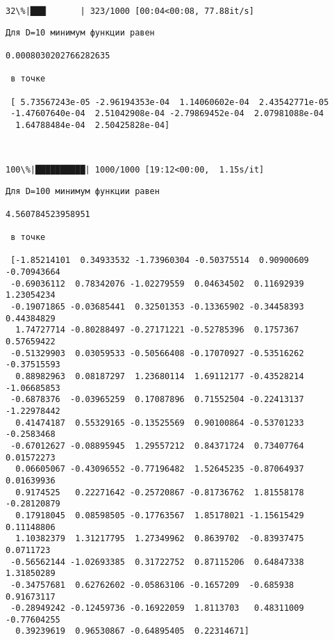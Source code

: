 \documentclass[11pt]{article}
\begin{document}
    \begin{Verbatim}[commandchars=\\\{\}]
 32\%|███▏      | 323/1000 [00:04<00:08, 77.88it/s]

    \end{Verbatim}

    \begin{Verbatim}[commandchars=\\\{\}]
Для D=10 минимум функции равен 

0.0008030202766282635

 в точке

 [ 5.73567243e-05 -2.96194353e-04  1.14060602e-04  2.43542771e-05
 -1.47607640e-04  2.51042908e-04 -2.79869452e-04  2.07981088e-04
  1.64788484e-04  2.50425828e-04]



    \end{Verbatim}

    \begin{Verbatim}[commandchars=\\\{\}]
100\%|██████████| 1000/1000 [19:12<00:00,  1.15s/it]   

    \end{Verbatim}

    \begin{Verbatim}[commandchars=\\\{\}]
Для D=100 минимум функции равен 

4.560784523958951

 в точке

 [-1.85214101  0.34933532 -1.73960304 -0.50375514  0.90900609 -0.70943664
 -0.69036112  0.78342076 -1.02279559  0.04634502  0.11692939  1.23054234
 -0.19071865 -0.03685441  0.32501353 -0.13365902 -0.34458393  0.44384829
  1.74727714 -0.80288497 -0.27171221 -0.52785396  0.1757367   0.57659422
 -0.51329903  0.03059533 -0.50566408 -0.17070927 -0.53516262 -0.37515593
  0.88982963  0.08187297  1.23680114  1.69112177 -0.43528214 -1.06685853
 -0.6878376  -0.03965259  0.17087896  0.71552504 -0.22413137 -1.22978442
  0.41474187  0.55329165 -0.13525569  0.90100864 -0.53701233 -0.2583468
 -0.67012627 -0.08895945  1.29557212  0.84371724  0.73407764  0.01572273
  0.06605067 -0.43096552 -0.77196482  1.52645235 -0.87064937  0.01639936
  0.9174525   0.22271642 -0.25720867 -0.81736762  1.81558178 -0.28120879
  0.17918045  0.08598505 -0.17763567  1.85178021 -1.15615429  0.11148806
  1.10382379  1.31217795  1.27349962  0.8639702  -0.83937475  0.0711723
 -0.56562144 -1.02693385  0.31722752  0.87115206  0.64847338  1.31850289
 -0.34757681  0.62762602 -0.05863106 -0.1657209  -0.685938    0.91673117
 -0.28949242 -0.12459736 -0.16922059  1.8113703   0.48311009 -0.77604255
  0.39239619  0.96530867 -0.64895405  0.22314671]



    \end{Verbatim}
\end{document}
